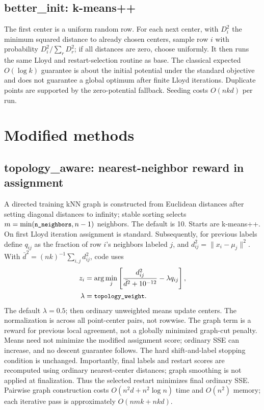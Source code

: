 \documentclass[conference]{IEEEtran}
\begin{document}
\subsection{better\_init: k-means++}
The first center is a uniform random row. For each next center, with \(D_i^2\) the minimum squared distance to already chosen centers, sample row \(i\) with probability \(D_i^2/\sum_rD_r^2\); if all distances are zero, choose uniformly. It then runs the same Lloyd and restart-selection routine as base. The classical expected \(O(\log k)\) guarantee is about the initial potential under the standard objective and does not guarantee a global optimum after finite Lloyd iterations. Duplicate points are supported by the zero-potential fallback. Seeding costs \(O(nkd)\) per run.
\section{Modified methods}
\subsection{topology\_aware: nearest-neighbor reward in assignment}
A directed training kNN graph is constructed from Euclidean distances after setting diagonal distances to infinity; stable sorting selects \(m=\min(\texttt{\small n\_neighbors},n-1)\) neighbors. The default is 10. Starts are k-means++. On first Lloyd iteration assignment is standard. Subsequently, for previous labels define \(q_{ij}\) as the fraction of row \(i\)'s neighbors labeled \(j\), and \(d_{ij}^2=\|x_i-\mu_j\|^2\). With \(\bar d^2=(nk)^{-1}\sum_{i,j}d_{ij}^2\), code uses
\begin{equation}\label{eq:topo}\begin{aligned}
z_i&=\arg\min_j\left[\frac{d_{ij}^2}{\bar d^2+10^{-12}}-\lambda q_{ij}\right],\\
\lambda&=\texttt{\small topology\_weight}.
\end{aligned}\end{equation}
The default \(\lambda=0.5\); then ordinary unweighted means update centers. The normalization is across all point-center pairs, not rowwise. The graph term is a reward for previous local agreement, not a globally minimized graph-cut penalty. Means need not minimize the modified assignment score; ordinary SSE can increase, and no descent guarantee follows. The hard shift-and-label stopping condition is unchanged. Importantly, final labels and restart scores are recomputed using ordinary nearest-center distances; graph smoothing is not applied at finalization. Thus the selected restart minimizes final ordinary SSE. Pairwise graph construction costs \(O(n^2d+n^2\log n)\) time and \(O(n^2)\) memory; each iterative pass is approximately \(O(nmk+nkd)\).
\end{document}
